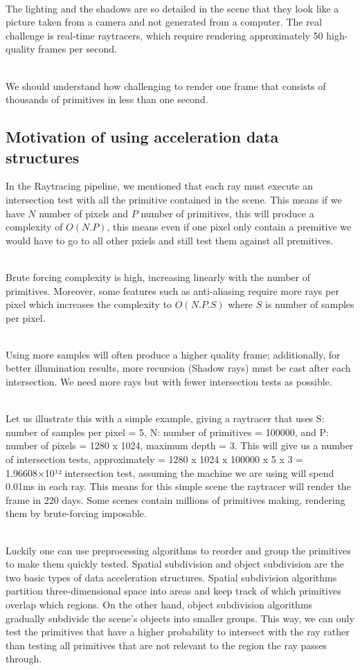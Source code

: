 \documentclass[11pt,a4paper]{article}
\begin{document}
\noindent
\\
The lighting and the shadows are so detailed in the scene that they look like a picture taken from a camera and not generated from a computer. The real challenge is real-time raytracers, which require rendering approximately 50 high-quality frames per second.

\noindent
\\
We should understand how challenging to render one frame that consists of thousands of primitives in less than one second. 

\subsection{Motivation of using acceleration data structures}
In the Raytracing pipeline, we mentioned that each ray must execute an intersection test with all the primitive contained in the scene.  This means if we have $N$ number of pixels and $P$ number of primitives, this will produce a complexity of $O(N.P)$, this means even if one pixel only contain a premitive we would have to go to all other pxiels and still test them against all premitives. 

\noindent
\\
Brute forcing complexity is high, increasing linearly with the number of primitives. Moreover, some features such as anti-aliasing require more rays per pixel which increases the complexity to  $O(N.P.S)$ where $S$ is number of samples per pixel. 

\noindent
\\
Using more samples will often produce a higher quality frame; additionally, for better illumination results, more recursion (Shadow rays) must be cast after each intersection. We need more rays but with fewer intersection tests as possible.

\noindent
\\
Let us illustrate this with a simple example, giving a raytracer that uses S: number of samples per pixel = 5, N: number of primitives = 100000, and P: number of pixels =  1280 x 1024, maximum depth = 3. This will give us a number of intersection tests, approximately = 1280 x 1024 x 100000 x 5 x 3 = 1.96608×10¹² intersection test, assuming the machine we are using will spend 0.01ms in each ray. This means for this simple scene the raytracer will render the frame in 220 days. Some scenes contain millions of primitives making, rendering them by brute-forcing imposable. 

\noindent
\\ 
Luckily one can use preprocessing algorithms to reorder and group the primitives to make them quickly tested. Spatial subdivision and object subdivision are the two basic types of data acceleration structures. Spatial subdivision algorithms partition three-dimensional space into areas and keep track of which primitives overlap which regions. On the other hand, object subdivision algorithms gradually subdivide the scene's objects into smaller groups. This way, we can only test the primitives that have a higher probability to intersect with the ray rather than testing all primitives that are not relevant to the region the ray passes through. 
\end{document}
